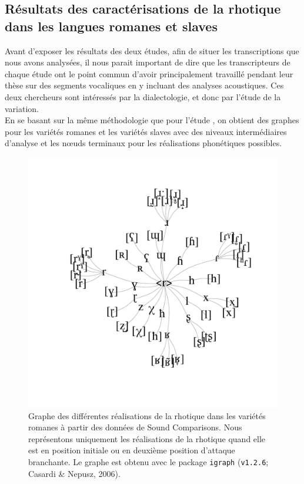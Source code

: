 \subsection{Résultats des caractérisations de la rhotique dans les langues romanes et slaves}

Avant d'exposer les résultats des deux études, afin de situer les transcriptions que nous avons analysées, il nous parait important de dire que les transcripteurs de chaque étude ont le point commun d'avoir principalement travaillé pendant leur thèse sur des segments vocaliques en y incluant des analyses acoustiques. Ces deux chercheurs sont intéressés par la dialectologie, et donc par l'étude de la variation.\\

En se basant sur la même méthodologie que pour l'étude , on obtient des graphes pour les variétés romanes et les variétés slaves avec des niveaux intermédiaires d'analyse et les nœuds terminaux pour les réalisations phonétiques possibles.\\

\begin{figure}
	\centering
	\includegraphics[width=\linewidth]{substance/images/romance_rhotics}
	\caption[Graphe des différentes réalisations de la rhotique dans les variétés romanes]{Graphe des différentes réalisations de la rhotique dans les variétés romanes à partir des données de Sound Comparisons. Nous représentons uniquement les réalisations de la rhotique quand elle est en position initiale ou en deuxième position d'attaque branchante. Le graphe est obtenu avec le package \texttt{igraph} (\texttt{v1.2.6}; Casardi \& Nepusz, 2006).}
	\label{fig:romancerhotics}
\end{figure}

